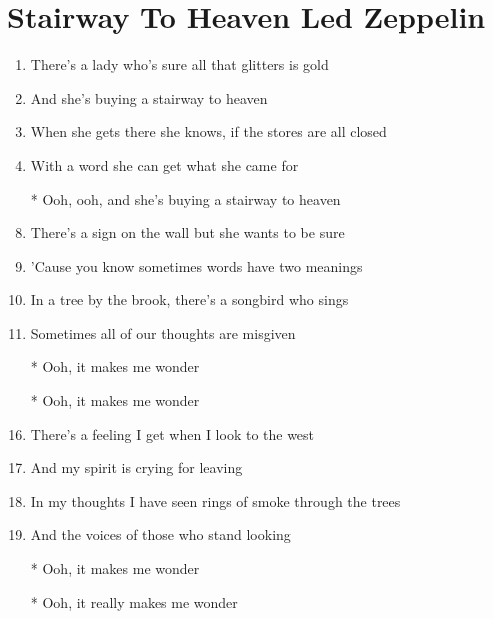 \documentclass{article}
\begin{document}
    \section*{Stairway To Heaven \by  Led Zeppelin}

    \begin{center}
        \begin{enumerate}
            \item There's a lady who's sure all that glitters is gold
            \item And she's buying a stairway to heaven
            \item When she gets there she knows, if the stores are all closed
            \item With a word she can get what she came for

            \item[]
            \item[*] Ooh, ooh, and she's buying a stairway to heaven
            \item[]

            \item There's a sign on the wall but she wants to be sure
            \item 'Cause you know sometimes words have two meanings
            \item In a tree by the brook, there's a songbird who sings
            \item Sometimes all of our thoughts are misgiven

            \item[]
            \item[*] Ooh, it makes me wonder
            \item[*] Ooh, it makes me wonder
            \item[] 

            \item There's a feeling I get when I look to the west
            \item And my spirit is crying for leaving
            \item In my thoughts I have seen rings of smoke through the trees
            \item And the voices of those who stand looking

            \item[]
            \item[*] Ooh, it makes me wonder
            \item[*] Ooh, it really makes me wonder
            \item[] 


\end{enumerate}
\end{center}
\end{document}
